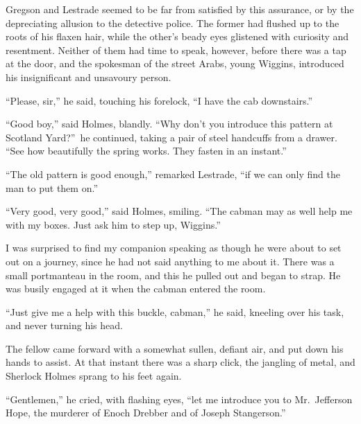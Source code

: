 \documentclass[12pt,english]{book}
\begin{document}
Gregson and Lestrade seemed to be far from satisfied by this assurance,
or by the depreciating allusion to the detective police. The former
had flushed up to the roots of his flaxen hair, while the other's
beady eyes glistened with curiosity and resentment. Neither of them
had time to speak, however, before there was a tap at the door, and
the spokesman of the street Arabs, young Wiggins, introduced his insignificant
and unsavoury person.

{}``Please, sir,'' he said, touching his forelock, {}``I have the
cab downstairs.''

{}``Good boy,'' said Holmes, blandly. {}``Why don't you introduce
this pattern at Scotland Yard?''\ he continued, taking a pair of
steel handcuffs from a drawer. {}``See how beautifully the spring
works. They fasten in an instant.''

{}``The old pattern is good enough,'' remarked Lestrade, {}``if
we can only find the man to put them on.''

{}``Very good, very good,'' said Holmes, smiling. {}``The cabman
may as well help me with my boxes. Just ask him to step up, Wiggins.''

I was surprised to find my companion speaking as though he were about
to set out on a journey, since he had not said anything to me about
it. There was a small portmanteau in the room, and this he pulled
out and began to strap. He was busily engaged at it when the cabman
entered the room.

{}``Just give me a help with this buckle, cabman,'' he said, kneeling
over his task, and never turning his head.

The fellow came forward with a somewhat sullen, defiant air, and put
down his hands to assist. At that instant there was a sharp click,
the jangling of metal, and Sherlock Holmes sprang to his feet again.

{}``Gentlemen,'' he cried, with flashing eyes, {}``let me introduce
you to Mr.\ Jefferson Hope, the murderer of Enoch Drebber and of
Joseph Stangerson.''
\end{document}
